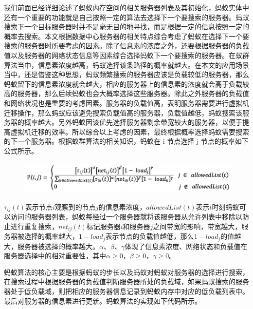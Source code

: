 我们前面已经详细论述了蚂蚁内存空间的相关服务器列表及其初始化，蚂蚁实体中还有一个重要的功能就是自己按照一定的算法去选择下一个要搜索的服务器。蚂蚁搜索下一个目标服务器时并不是毫无目的地寻找，而是根据一定的信息按照一定的概率去搜索。本文根据数据中心服务器的相关特点综合考虑了蚂蚁在选择下一个要搜索的服务器时所要考虑的因素。除了信息素的浓度之外，还要根据服务器的负载值以及服务器的网络状态信息等因素综合选择蚂蚁下一个要搜索的服务器。在蚁群算法当中，信息素浓度越高，蚂蚁选择该条路径的概率就越大。在本文的应用场景当中，还是借鉴这种思想，蚂蚁频繁搜索的服务器应该是负载较低的服务器，那么蚂蚁留下的信息素浓度就会越大，相应的服务器上的信息素的浓度就会高于负载较高的服务器，那么后续蚂蚁也会大概率选择这些服务器。除此之外服务器的负载值和网络状况也是重要的考虑因素。服务器的负载值高，表明服务器需要进行虚拟机迁移操作，那么蚂蚁应该避免搜索负载值高的服务器，负载值越低，蚂蚁搜索该服务器的概率越大。另外蚂蚁因该优先选择服务器剩余带宽较大的服务器，以便于提高虚拟机迁移的效率。所以综合以上考虑的因素，最终根据概率选择蚂蚁需要搜索的下一个服务器。根据蚁群算法的相关知识，蚂蚁在 i 节点选择 j 节点的概率如下公式所示。

\begin{figure}[htbp]
  \centering
  \includegraphics[width=0.8\linewidth]{./Figure/IMG_Chap3_5.png}
\end{figure}

$ τ_{ij} (t) $表示节点$ i $观察到的节点$ j $的信息素浓度，$allowedList(t) $表示$ t $时刻蚂蚁可以访问的服务器列表，蚂蚁每经过一个服务器就将该服务器从允许列表中移除以防止进行重复搜索，$net_{ij} (t) $标记服务器$ i $和服务器$ j $之间带宽的影响，带宽越大，服务器被选择的概率越大，$1 - load_j $表示节点的负载值越低，那么$ 1 - load_j $的值越大，服务器被选择的概率越大。$ α、β、γ $体现了信息素浓度、网络状态和负载值在服务器选择中的相对重要性，其中$ α ≥0，β ≥0，γ ≥0 $。

蚂蚁算法的核心主要是根据蚂蚁的步长以及蚂蚁对蚂蚁对服务器的选择进行搜索，在搜索过程中根据服务器的负载值判断服务器所处的负载域，如果蚂蚁搜索的服务器处于低负载域，则把相应的服务器信息记录到蚂蚁内存中对应的低负载列表中。最后对服务器的信息素进行更新。蚂蚁算法的实现如下代码所示。

